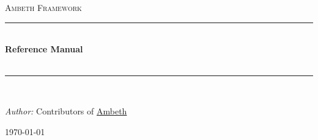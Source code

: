 \ifpdf
\begin{titlepage}

\begin{center}



\textsc{\huge Ambeth Framework}\\[1.5cm]

\newcommand{\HRule}{\rule{\linewidth}{0.5mm}}
\HRule \\[0.4cm]
{ \huge \bfseries Reference Manual}\\[0.4cm]
{ \huge \bfseries \version}\\[0.4cm]
\HRule \\[1.5cm]

\begin{minipage}{0.5\textwidth}
\begin{flushleft} \large
\emph{Author:} Contributors of \href{https://github.com/Dennis-Koch/ambeth}{Ambeth}\\
\end{flushleft}
\end{minipage}

\vfill

{\large \today}

\end{center}

\end{titlepage}
\fi